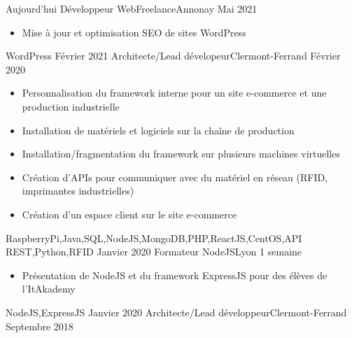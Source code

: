 %
%
%

\begin{experiences}
  \experience
    {Aujourd'hui}   {Développeur Web}{Freelance}{Annonay}
    {Mai 2021} {
                      \begin{itemize}
                        \item Mise à jour et optimisation SEO de sites WordPress  
                      \end{itemize}
                    }
                    {WordPress}
  \emptySeparator
  \experience
    {Février 2021} {Architecte/Lead dévelopeur}{}{Clermont-Ferrand}
    {Février 2020}    {
                      \begin{itemize}
			\item Personnalisation du framework interne pour un site e-commerce et une production industrielle
			\item Installation de matériels et logiciels sur la chaîne de production
			\item Installation/fragmentation du framework sur plusieurs machines virtuelles
			\item Création d'APIs pour communiquer avec du matériel en réseau (RFID, imprimantes industrielles)
			\item Création d'un espace client sur le site e-commerce
                      \end{itemize}
                    }
                    {RaspberryPi,Java,SQL,NodeJS,MongoDB,PHP,ReactJS,CentOS,API REST,Python,RFID}
  \emptySeparator
  \experience
    {Janvier 2020}     {Formateur NodeJS}{}{Lyon}
    {1 semaine}    {
                      \begin{itemize}
			\item Présentation de NodeJS et du framework ExpressJS pour des élèves de l'ItAkademy
                      \end{itemize}
                    }
                    {NodeJS,ExpressJS}
  \emptySeparator
  \experience
  {Janvier 2020}       {Architecte/Lead développeur}{}{Clermont-Ferrand}
  {Septembre 2018}  {
                      \begin{itemize}

\end{itemize}}
\end{experiences}
